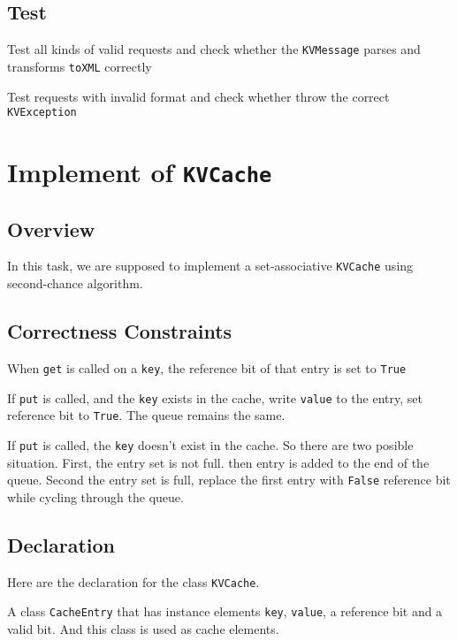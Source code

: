 \documentclass{article}
\begin{document}
\subsection{Test}
\begin{compactitem}
	\item Test all kinds of valid requests and check whether the \texttt{KVMessage} parses and transforms \texttt{toXML} correctly
	\item Test requests with invalid format and check whether throw the correct \texttt{KVException}
\end{compactitem}


\section{Implement of \texttt{KVCache}}
\subsection{Overview}
In this task, we are supposed to implement a set-associative \texttt{KVCache} using second-chance algorithm.
\subsection{Correctness Constraints}
\begin{compactitem}
\item When \texttt{get} is called on a \texttt{key}, the reference bit of that entry is set to \texttt{True}
\item If \texttt{put} is called, and the \texttt{key} exists in the cache, write \texttt{value} to the entry, set reference bit to \texttt{True}. The queue remains the same.
\item If \texttt{put} is called, the \texttt{key} doesn't exist in the cache. So there are two posible situation. First, the entry set is not full. then entry is added to the end of the queue. Second the entry set is full, replace the first entry with \texttt{False} reference bit while cycling through the queue.
\end{compactitem}
\subsection{Declaration}
Here are the declaration for the class \texttt{KVCache}.

A class \texttt{CacheEntry} that has instance elements \texttt{key}, \texttt{value}, a reference bit and a valid bit. And this class is used as cache elements.
\end{document}
